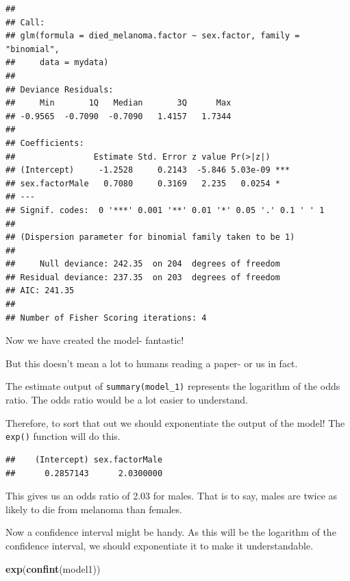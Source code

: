 \documentclass[]{book}
\makeatletter
\newenvironment{Shaded}{\begin{snugshade}}{\end{snugshade}}
\newcommand{\KeywordTok}[1]{\textcolor[rgb]{0.13,0.29,0.53}{\textbf{#1}}}
\newcommand{\NormalTok}[1]{#1}
\newcommand{\OperatorTok}[1]{\textcolor[rgb]{0.81,0.36,0.00}{\textbf{#1}}}
\newenvironment{kframe}{%
\medskip{}
\setlength{\fboxsep}{.8em}
 \def\at@end@of@kframe{}%
 \ifinner\ifhmode%
  \def\at@end@of@kframe{\end{minipage}}%
  \begin{minipage}{\columnwidth}%
 \fi\fi%
 \def\FrameCommand##1{\hskip\@totalleftmargin \hskip-\fboxsep
 \colorbox{shadecolor}{##1}\hskip-\fboxsep
     \hskip-\linewidth \hskip-\@totalleftmargin \hskip\columnwidth}%
 \MakeFramed {\advance\hsize-\width
   \@totalleftmargin\z@ \linewidth\hsize
   \@setminipage}}%
 {\par\unskip\endMakeFramed%
 \at@end@of@kframe}
\renewenvironment{Shaded}{\begin{kframe}}{\end{kframe}}
\theoremstyle{definition}
\theoremstyle{definition}
\theoremstyle{definition}
\theoremstyle{remark}
\makeatother
\begin{document}
\begin{verbatim}
## 
## Call:
## glm(formula = died_melanoma.factor ~ sex.factor, family = "binomial", 
##     data = mydata)
## 
## Deviance Residuals: 
##     Min       1Q   Median       3Q      Max  
## -0.9565  -0.7090  -0.7090   1.4157   1.7344  
## 
## Coefficients:
##                Estimate Std. Error z value Pr(>|z|)    
## (Intercept)     -1.2528     0.2143  -5.846 5.03e-09 ***
## sex.factorMale   0.7080     0.3169   2.235   0.0254 *  
## ---
## Signif. codes:  0 '***' 0.001 '**' 0.01 '*' 0.05 '.' 0.1 ' ' 1
## 
## (Dispersion parameter for binomial family taken to be 1)
## 
##     Null deviance: 242.35  on 204  degrees of freedom
## Residual deviance: 237.35  on 203  degrees of freedom
## AIC: 241.35
## 
## Number of Fisher Scoring iterations: 4
\end{verbatim}

Now we have created the model- fantastic!

But this doesn't mean a lot to humans reading a paper- or us in fact.

The estimate output of \texttt{summary(model\_1)} represents the
logarithm of the odds ratio. The odds ratio would be a lot easier to
understand.

Therefore, to sort that out we should exponentiate the output of the
model! The \texttt{exp()} function will do this.

\begin{Shaded}
\end{Shaded}

\begin{verbatim}
##    (Intercept) sex.factorMale 
##      0.2857143      2.0300000
\end{verbatim}

This gives us an odds ratio of 2.03 for males. That is to say, males are
twice as likely to die from melanoma than females.

Now a confidence interval might be handy. As this will be the logarithm
of the confidence interval, we should exponentiate it to make it
understandable.

\begin{Shaded}
\begin{Highlighting}[]
\KeywordTok{exp}\NormalTok{(}\KeywordTok{confint}\NormalTok{(model1))}
\end{Highlighting}
\end{Shaded}
\end{document}
